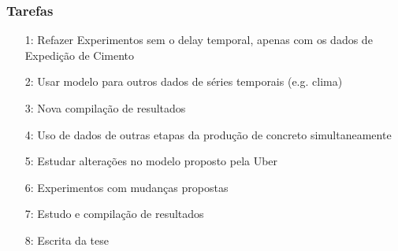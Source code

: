 \documentclass{beamer}
\begin{document}
\begin{frame}
  \frametitle{Tarefas}
\begin{itemize}

\item[1: ] Refazer Experimentos sem o delay temporal, apenas com os dados
  de Expedição de Cimento
\item[2: ] Usar modelo para outros dados de séries temporais (e.g. clima)
\item[3: ] Nova compilação de resultados
\item[4: ] Uso de dados de outras etapas da produção de concreto simultaneamente
\item[5: ] Estudar alterações no modelo proposto pela Uber  
\item[6: ] Experimentos com mudanças propostas 
\item[7: ] Estudo e compilação de resultados
\item[8: ] Escrita da tese 


  
\end{itemize}

\end{frame}
\end{document}
